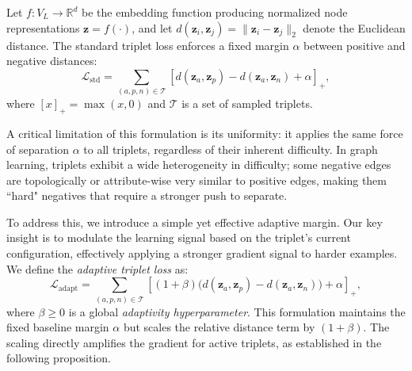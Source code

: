 \documentclass[pdflatex,sn-mathphys-num]{sn-jnl}%
\theoremstyle{thmstyleone}%
\theoremstyle{thmstyletwo}%
\theoremstyle{thmstylethree}%
\theoremstyle{plain} %
\theoremstyle{definition} %
\theoremstyle{remark} %
\theoremstyle{plain} %
\begin{document}
Let $f: V_L \to \mathbb{R}^d$ be the embedding function producing normalized node representations $\mathbf{z} = f(\cdot)$, and let $d(\mathbf{z}_i, \mathbf{z}_j) = \|\mathbf{z}_i - \mathbf{z}_j\|_2$ denote the Euclidean distance. The standard triplet loss enforces a fixed margin $\alpha$ between positive and negative distances:
\begin{equation}
\label{eq:standard_triplet}
    \mathcal{L}_{\text{std}} = \sum_{(a, p, n) \in \mathcal{T}} \left[ d(\mathbf{z}_a, \mathbf{z}_p) - d(\mathbf{z}_a, \mathbf{z}_n) + \alpha \right]_+,
\end{equation}
where $[x]_+ = \max(x, 0)$ and $\mathcal{T}$ is a set of sampled triplets.

A critical limitation of this formulation is its uniformity: it applies the same force of separation $\alpha$ to all triplets, regardless of their inherent difficulty. In graph learning, triplets exhibit a wide heterogeneity in difficulty; some negative edges are topologically or attribute-wise very similar to positive edges, making them ``hard" negatives that require a stronger push to separate.

To address this, we introduce a simple yet effective adaptive margin. Our key insight is to modulate the learning signal based on the triplet's current configuration, effectively applying a stronger gradient signal to harder examples. We define the \textit{adaptive triplet loss} as:
\begin{equation}
\label{eq:adaptive_triplet}
    \mathcal{L}_{\text{adapt}} = \sum_{(a, p, n) \in \mathcal{T}} \left[ (1 + \beta) \big( d(\mathbf{z}_a, \mathbf{z}_p) - d(\mathbf{z}_a, \mathbf{z}_n) \big) + \alpha \right]_+,
\end{equation}
where $\beta \ge 0$ is a global \textit{adaptivity hyperparameter}. This formulation maintains the fixed baseline margin $\alpha$ but scales the relative distance term by $(1+\beta)$. The scaling directly amplifies the gradient for active triplets, as established in the following proposition.
\end{document}
